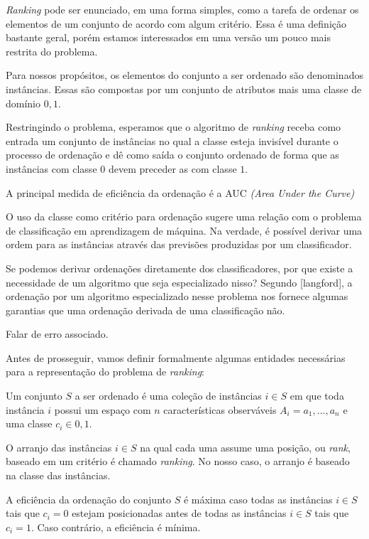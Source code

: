 \emph{Ranking} pode ser enunciado, em uma forma simples, como a tarefa de
ordenar os elementos de um conjunto de acordo com algum critério. Essa é uma
definição bastante geral, porém estamos interessados em uma versão um pouco mais
restrita do problema.

Para nossos propósitos, os elementos do conjunto a ser ordenado são denominados
instâncias. Essas são compostas por um conjunto de atributos mais uma classe de
domínio ${0, 1}$.

Restringindo o problema, esperamos que o algoritmo de \emph{ranking} receba como
entrada um conjunto de instâncias no qual a classe esteja invisível durante o
processo de ordenação e dê como saída o conjunto ordenado de forma que as
instâncias com classe $0$ devem preceder as com classe $1$.

A principal medida de eficiência da ordenação é a AUC
\emph{(Area Under the Curve)}

O uso da classe como critério para ordenação sugere uma relação com o problema
de classificação em aprendizagem de máquina. Na verdade, é possível derivar uma
ordem para as instâncias através das previsões produzidas por um classificador.

Se podemos derivar ordenações diretamente dos classificadores, por que existe
a necessidade de um algoritmo que seja especializado nisso? Segundo [langford],
a ordenação por um algoritmo especializado nesse problema nos fornece algumas
garantias que uma ordenação derivada de uma classificação não.

Falar de erro associado.

Antes de prosseguir, vamos definir formalmente algumas entidades necessárias
para a representação do problema de \emph{ranking}:

Um conjunto $S$ a ser ordenado é uma coleção de instâncias $i \in S$ em que toda
instância $i$ possui um espaço com $n$ características observáveis
$A_i = {a_1, ..., a_n}$ e uma classe $c_i \in {0, 1}$.

O arranjo das instâncias $i \in S$ na qual cada uma assume uma posição, ou
\emph{rank}, baseado em um critério é chamado \emph{ranking}. No nosso caso, o
arranjo é baseado na classe das instâncias.

A eficiência da ordenação do conjunto $S$ é máxima caso todas as instâncias
$i \in S$ tais que $c_i = 0$ estejam posicionadas antes de todas as instâncias
$i \in S$ tais que $c_i = 1$. Caso contrário, a eficiência é mínima.
